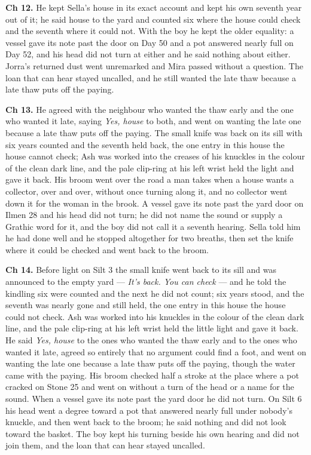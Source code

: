 \documentclass{design/chronicle}
\begin{document}
{\textbf{Ch 12.} He kept Sella’s house in its exact account and kept his own seventh year out of it; he said house to the yard and counted six where the house could check and the seventh where it could not. With the boy he kept the older equality: a vessel gave its note past the door on Day 50 and a pot answered nearly full on Day 52, and his head did not turn at either and he said nothing about either. Jorra’s returned dust went unremarked and Mira passed without a question. The loan that can hear stayed uncalled, and he still wanted the late thaw because a late thaw puts off the paying.

\textbf{Ch 13.} He agreed with the neighbour who wanted the thaw early and the one who wanted it late, saying \emph{Yes, house} to both, and went on wanting the late one because a late thaw puts off the paying. The small knife was back on its sill with six years counted and the seventh held back, the one entry in this house the house cannot check; Ash was worked into the creases of his knuckles in the colour of the clean dark line, and the pale clip-ring at his left wrist held the light and gave it back. His broom went over the road a man takes when a house wants a collector, over and over, without once turning along it, and no collector went down it for the woman in the brook. A vessel gave its note past the yard door on Ilmen 28 and his head did not turn; he did not name the sound or supply a Grathic word for it, and the boy did not call it a seventh hearing. Sella told him he had done well and he stopped altogether for two breaths, then set the knife where it could be checked and went back to the broom.

\textbf{Ch 14.} Before light on Silt 3 the small knife went back to its sill and was announced to the empty yard — \emph{It’s back. You can check} — and he told the kindling six were counted and the next he did not count; six years stood, and the seventh was nearly gone and still held, the one entry in this house the house could not check. Ash was worked into his knuckles in the colour of the clean dark line, and the pale clip-ring at his left wrist held the little light and gave it back. He said \emph{Yes, house} to the ones who wanted the thaw early and to the ones who wanted it late, agreed so entirely that no argument could find a foot, and went on wanting the late one because a late thaw puts off the paying, though the water came with the paying. His broom checked half a stroke at the place where a pot cracked on Stone 25 and went on without a turn of the head or a name for the sound. When a vessel gave its note past the yard door he did not turn. On Silt 6 his head went a degree toward a pot that answered nearly full under nobody’s knuckle, and then went back to the broom; he said nothing and did not look toward the basket. The boy kept his turning beside his own hearing and did not join them, and the loan that can hear stayed uncalled.

}
\end{document}
